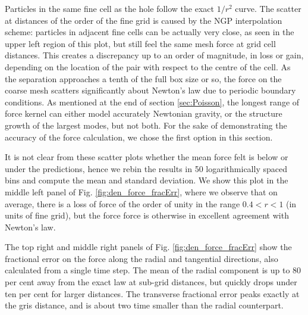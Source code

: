 Particles in the same fine cell as the hole follow the exact $1/r^{2}$ curve. The scatter at 
  distances of the order of the fine grid is caused by the NGP interpolation scheme:
  particles in adjacent fine cells can be actually very close, as seen in the upper left region of this plot,
  but still feel the same mesh force at grid cell distances.
This  creates a discrepancy up to an order of magnitude, in loss or gain, depending on the location of the pair with respect to the centre of the cell.
As the separation approaches a tenth of the full box size or so, the force on the coarse mesh 
scatters significantly about Newton's law due to periodic boundary conditions. 
As mentioned at the end of section \ref{sec:Poisson}, the longest range of force kernel can either model accurately Newtonian gravity,
or the structure growth of the largest modes, but not both. For the sake of demonstrating the accuracy of the force calculation,
we chose the first option in this section.

It is not clear from these scatter plots whether the mean force felt  is below or under the predictions, hence we rebin the results
in 50 logarithmically spaced bins and compute the mean and standard deviation. 
We show this plot in the middle left panel of Fig. \ref{fig:den_force_fracErr}, where we observe that on average,
there is a loss of force of the order of unity in the range $ 0.4 < r < 1$ (in units of fine grid), but the force force is otherwise
in excellent agreement with Newton's law.


The top right and middle right panels of Fig. \ref{fig:den_force_fracErr} show the fractional error on the force along the radial and tangential directions, also calculated from a single time step.
The mean of the radial component is up to 80 per cent away from the exact law at sub-grid distances, but quickly drops under ten per cent for larger distances. 
The transverse fractional error peaks exactly at the gris distance,  and is about two time smaller than the radial counterpart.

